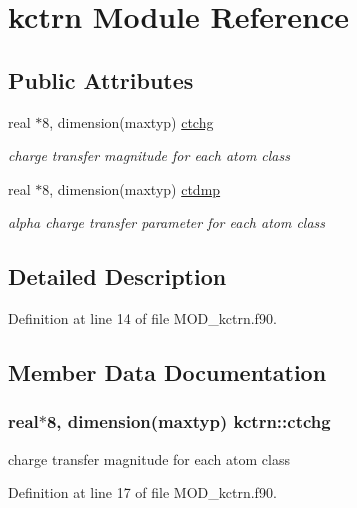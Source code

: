 \hypertarget{classkctrn}{\section{kctrn Module Reference}
\label{classkctrn}
}
\subsection*{Public Attributes}
\begin{DoxyCompactItemize}
\item 
real $\ast$8, dimension(maxtyp) \hyperlink{classkctrn_ad0ac9c5aafa4b4f1f790eb2a9e2aeb9f}{ctchg}
\begin{DoxyCompactList}\small\item\em charge transfer magnitude for each atom class \end{DoxyCompactList}\item 
real $\ast$8, dimension(maxtyp) \hyperlink{classkctrn_ae00b8e138190b3b5418f5b4bb46a664c}{ctdmp}
\begin{DoxyCompactList}\small\item\em alpha charge transfer parameter for each atom class \end{DoxyCompactList}\end{DoxyCompactItemize}


\subsection{Detailed Description}


Definition at line 14 of file M\-O\-D\-\_\-kctrn.\-f90.



\subsection{Member Data Documentation}
\hypertarget{classkctrn_ad0ac9c5aafa4b4f1f790eb2a9e2aeb9f}{
\subsubsection[{ctchg}]{\setlength{\rightskip}{0pt plus 5cm}real$\ast$8, dimension(maxtyp) kctrn\-::ctchg}}\label{classkctrn_ad0ac9c5aafa4b4f1f790eb2a9e2aeb9f}


charge transfer magnitude for each atom class 



Definition at line 17 of file M\-O\-D\-\_\-kctrn.\-f90.

